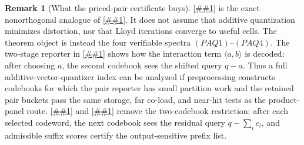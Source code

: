 \documentclass[10pt]{article}
\newcommand{\cref}[1]{\ref{##1}}
\newcommand{\Cref}[1]{\ref{##1}}
\theoremstyle{definition}
\newtheorem{remark}[theorem]{Remark}
\newcommand{\ip}[2]{\langle #1,#2\rangle}
\begin{document}
\begin{remark}[What the priced-pair certificate buys]
   \label{rem:priced-pair-certificate-buys}
   \Cref{prop:priced-pair-additive-ivf-compiler} is the exact nonorthogonal
   analogue of \cref{cor:additive-ivf-product-panel}.  It does not assume that
   additive quantization minimizes distortion, nor that Lloyd iterations
   converge to useful cells.  The theorem object is instead the four
   verifiable spectra \((PAQ1)\)--\((PAQ4)\).  The two-stage reporter in
   \cref{lem:priced-pair-additive-ivf-reporter} shows how the interaction term
   \(\ip{a}{b}\) is decoded: after choosing \(a\), the second codebook sees the
   shifted query \(q-a\).  Thus a full additive-vector-quantizer index can be
   analyzed if preprocessing constructs codebooks for which the pair reporter
   has small partition work and the retained pair buckets pass the same
   storage, far co-load, and near-hit tests as the product-panel route.
   \Cref{lem:priced-prefix-additive-ivf-reporter} and
   \cref{prop:priced-prefix-additive-ivf-compiler} remove the two-codebook
   restriction: after each selected codeword, the next codebook sees the
   residual query \(q-\sum_i c_i\), and admissible suffix scores certify the
   output-sensitive prefix list.
\end{remark}
\end{document}
